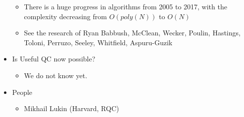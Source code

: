 \documentclass[11pt]{article}
\begin{document}
\begin{itemize}
\begin{itemize}
\item There is a huge progress in algorithms from 2005 to 2017, with the complexity decreasing from \(O(poly(N))\) to \(O(N)\)
\item See the research of Ryan Babbush, McClean, Wecker, Poulin, Hastings, Toloni, Perruzo, Seeley, Whitfield, Aspuru-Guzik
\end{itemize}
\item Is Useful QC now possible?
\begin{itemize}
\item We do not know yet.
\end{itemize}
\item People
\begin{itemize}
\item Mikhail Lukin (Harvard, RQC)
\end{itemize}
\end{itemize}
\end{document}
